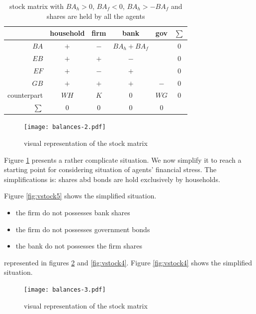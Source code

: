 \documentclass{article}
\begin{document}
\begin{table}[p]
	\centering
\begin{tabular}{r c c c c c}
	\hline
	& household 	& \parbox{1.5cm}{\centerline{firm}} & \parbox{1.5cm}{\centerline{bank}} & \parbox{1.5cm}{\centerline{gov}} &$\sum$\\
\hline
\hline
$BA$	&	$+$	&$-$	&$BA_h+BA_f$&&0\\
$EB$	&	$+$	&$+$	&$-$&&0\\
$EF$	&	$+$	&$-$	&$+$&&0\\
$GB$	&	$+$	&$+$	&$+$&$-$&0\\
	\hline
counterpart	&	$WH$	&$K$&0&$WG$	&0\\
	\hline
	\hline
$\sum$ &	0	&0	&0&0
\end{tabular}
	\caption{stock matrix with $BA_h>0$, $BA_f<0$, $BA_h>-BA_f$ and shares are held by all the agents}
	\label{tab:sm3}
\end{table}

\begin{figure}[p]
\hskip-3cm
\texttt{[image: balances-2.pdf]}
	\caption{visual representation of the stock matrix}
	\label{fig:vstock2}
\end{figure}

\clearpage


Figure \ref{fig:vstock2} presents a rather complicate situation. We now simplify it to reach a starting point for considering situation of agents' financial stress. 
The simplifications is: shares abd bonds are hold exclusively by households. 

Figure \ref{fig:vstock5} shows the simplified situation.   

\iffalse
\begin{itemize}
	\item the firm do not possesses bank shares
	\item the firm do not possesses government bonds
	\item the bank do not possesses the firm shares
\end{itemize}

represented in figures \ref{fig:vstock3} and \ref{fig:vstock4}.
Figure \ref{fig:vstock4} shows the simplified situation.   


\begin{figure}[p]
\hskip-3cm
\texttt{[image: balances-3.pdf]}
	\caption{visual representation of the stock matrix}
	\label{fig:vstock3}
\end{figure}
\end{document}
